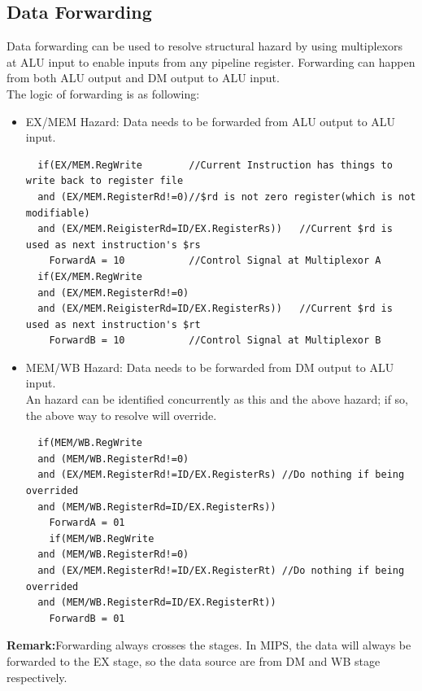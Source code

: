 \documentclass[12pt]{article}
\theoremstyle{definition}
\begin{document}
\subsection{Data Forwarding}
Data forwarding can be used to resolve structural hazard by using multiplexors at ALU input to enable inputs from any pipeline register. Forwarding can happen from both ALU output and DM output to ALU input.\\The logic of forwarding is as following:
\begin{itemize}
  \item EX/MEM Hazard: Data needs to be forwarded from ALU output to ALU input.
  \begin{verbatim}
  if(EX/MEM.RegWrite        //Current Instruction has things to write back to register file
  and (EX/MEM.RegisterRd!=0)//$rd is not zero register(which is not modifiable)
  and (EX/MEM.ReigisterRd=ID/EX.RegisterRs))   //Current $rd is used as next instruction's $rs
    ForwardA = 10           //Control Signal at Multiplexor A
  if(EX/MEM.RegWrite        
  and (EX/MEM.RegisterRd!=0)
  and (EX/MEM.ReigisterRd=ID/EX.RegisterRs))   //Current $rd is used as next instruction's $rt
    ForwardB = 10           //Control Signal at Multiplexor B
  \end{verbatim}
  \item MEM/WB Hazard: Data needs to be forwarded from DM output to ALU input. \\An hazard can be identified concurrently as this and the above hazard; if so, the above way to resolve will override.
  \begin{verbatim}
  if(MEM/WB.RegWrite
  and (MEM/WB.RegisterRd!=0)
  and (EX/MEM.RegisterRd!=ID/EX.RegisterRs) //Do nothing if being overrided
  and (MEM/WB.RegisterRd=ID/EX.RegisterRs))
    ForwardA = 01
    if(MEM/WB.RegWrite
  and (MEM/WB.RegisterRd!=0)
  and (EX/MEM.RegisterRd!=ID/EX.RegisterRt) //Do nothing if being overrided
  and (MEM/WB.RegisterRd=ID/EX.RegisterRt))
    ForwardB = 01
  \end{verbatim}
\end{itemize}
\textbf{Remark:}Forwarding always crosses the stages. In MIPS, the data will always be forwarded to the EX stage, so the data source are from DM and WB stage respectively.
\end{document}
